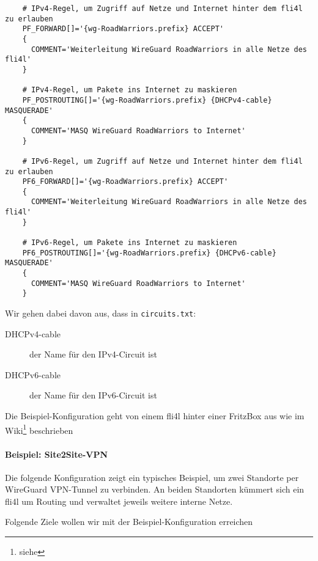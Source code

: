 \begin{example}
\begin{verbatim}
    # IPv4-Regel, um Zugriff auf Netze und Internet hinter dem fli4l zu erlauben
    PF_FORWARD[]='{wg-RoadWarriors.prefix} ACCEPT'
    {
      COMMENT='Weiterleitung WireGuard RoadWarriors in alle Netze des fli4l'
    }

    # IPv4-Regel, um Pakete ins Internet zu maskieren
    PF_POSTROUTING[]='{wg-RoadWarriors.prefix} {DHCPv4-cable} MASQUERADE'
    {
      COMMENT='MASQ WireGuard RoadWarriors to Internet'
    }

    # IPv6-Regel, um Zugriff auf Netze und Internet hinter dem fli4l zu erlauben
    PF6_FORWARD[]='{wg-RoadWarriors.prefix} ACCEPT'
    {
      COMMENT='Weiterleitung WireGuard RoadWarriors in alle Netze des fli4l'
    }

    # IPv6-Regel, um Pakete ins Internet zu maskieren
    PF6_POSTROUTING[]='{wg-RoadWarriors.prefix} {DHCPv6-cable} MASQUERADE'
    {
      COMMENT='MASQ WireGuard RoadWarriors to Internet'
    }
\end{verbatim}
\end{example}


Wir gehen dabei davon aus, dass in \verb+circuits.txt+:

\begin{description}
    \item[DHCPv4-cable] der Name für den IPv4-Circuit ist 
    \item[DHCPv6-cable] der Name für den IPv6-Circuit ist 
\end{description}


Die Beispiel-Konfiguration geht von einem fli4l hinter einer FritzBox aus wie im 
Wiki\footnote{siehe } beschrieben 


\paragraph{Beispiel: Site2Site-VPN}

\noindent

Die folgende Konfiguration zeigt ein typisches Beispiel, um zwei Standorte per WireGuard VPN-Tunnel 
zu verbinden. An beiden Standorten kümmert sich ein fli4l um Routing und verwaltet jeweils weitere 
interne Netze. 

Folgende Ziele wollen wir mit der Beispiel-Konfiguration erreichen

